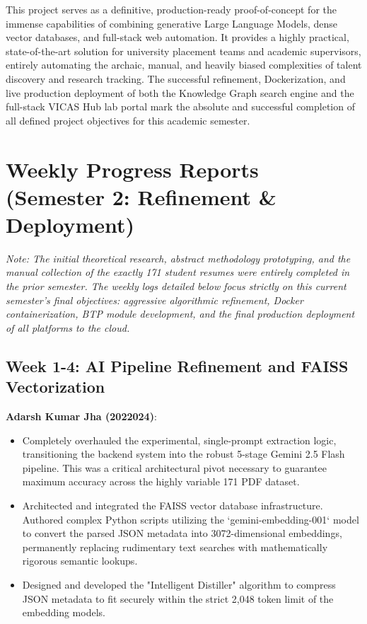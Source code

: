 \documentclass[12pt,a4paper]{report}
\begin{document}
This project serves as a definitive, production-ready proof-of-concept for the immense capabilities of combining generative Large Language Models, dense vector databases, and full-stack web automation. It provides a highly practical, state-of-the-art solution for university placement teams and academic supervisors, entirely automating the archaic, manual, and heavily biased complexities of talent discovery and research tracking. The successful refinement, Dockerization, and live production deployment of both the Knowledge Graph search engine and the full-stack VICAS Hub lab portal mark the absolute and successful completion of all defined project objectives for this academic semester.

\appendix

\chapter{Weekly Progress Reports (Semester 2: Refinement \& Deployment)}

\textit{Note: The initial theoretical research, abstract methodology prototyping, and the manual collection of the exactly 171 student resumes were entirely completed in the prior semester. The weekly logs detailed below focus strictly on this current semester's final objectives: aggressive algorithmic refinement, Docker containerization, BTP module development, and the final production deployment of all platforms to the cloud.}

\section{Week 1-4: AI Pipeline Refinement and FAISS Vectorization}

\textbf{Adarsh Kumar Jha (2022024)}:
\begin{itemize}
    \item Completely overhauled the experimental, single-prompt extraction logic, transitioning the backend system into the robust 5-stage Gemini 2.5 Flash pipeline. This was a critical architectural pivot necessary to guarantee maximum accuracy across the highly variable 171 PDF dataset.
    \item Architected and integrated the FAISS vector database infrastructure. Authored complex Python scripts utilizing the `gemini-embedding-001` model to convert the parsed JSON metadata into 3072-dimensional embeddings, permanently replacing rudimentary text searches with mathematically rigorous semantic lookups.
    \item Designed and developed the "Intelligent Distiller" algorithm to compress JSON metadata to fit securely within the strict 2,048 token limit of the embedding models.
\end{itemize}
\end{document}
